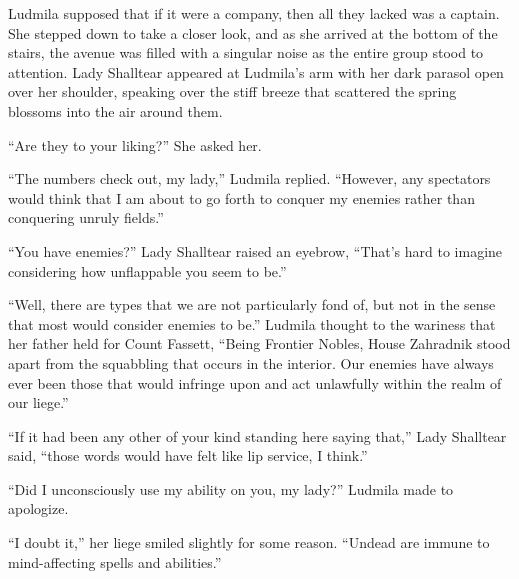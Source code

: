  

Ludmila supposed that if it were a company, then all they lacked was a captain. She stepped down to take a closer look, and as she arrived at the bottom of the stairs, the avenue was filled with a singular noise as the entire group stood to attention. Lady Shalltear appeared at Ludmila’s arm with her dark parasol open over her shoulder, speaking over the stiff breeze that scattered the spring blossoms into the air around them.

 

“Are they to your liking?” She asked her.

 

“The numbers check out, my lady,” Ludmila replied. “However, any spectators would think that I am about to go forth to conquer my enemies rather than conquering unruly fields.”

 

“You have enemies?” Lady Shalltear raised an eyebrow, “That’s hard to imagine considering how unflappable you seem to be.”

 

“Well, there are types that we are not particularly fond of, but not in the sense that most would consider enemies to be.” Ludmila thought to the wariness that her father held for Count Fassett, “Being Frontier Nobles, House Zahradnik stood apart from the squabbling that occurs in the interior. Our enemies have always ever been those that would infringe upon and act unlawfully within the realm of our liege.”

 

“If it had been any other of your kind standing here saying that,” Lady Shalltear said, “those words would have felt like lip service, I think.”

 

“Did I unconsciously use my ability on you, my lady?” Ludmila made to apologize.

 

“I doubt it,” her liege smiled slightly for some reason. “Undead are immune to mind-affecting spells and abilities.”